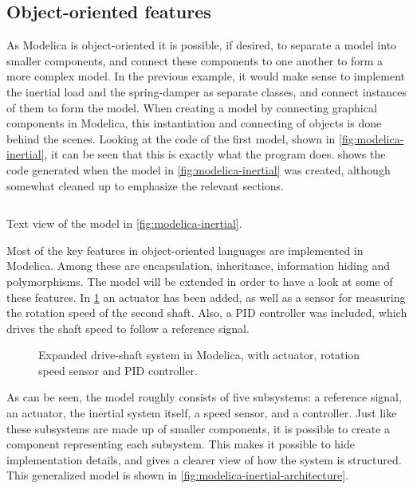 \documentclass[\rootfolder/main.tex]{subfiles}
\begin{document}
\subsection{Object-oriented features}

As Modelica is object-oriented it is possible, if desired, to separate a model into smaller components, and connect these components to one another to form a more complex model.
In the previous example, it would make sense to implement the inertial load and the spring-damper as separate classes, and connect instances of them to form the model.
When creating a model by connecting graphical components in Modelica, this instantiation and connecting of objects is done behind the scenes.
Looking at the code of the first model, shown in \cref{fig:modelica-inertial}, it can be seen that this is exactly what the program does.
 shows the code generated when the model in \cref{fig:modelica-inertial} was created, although somewhat cleaned up to emphasize the relevant sections.

\begin{listing}[ht]
    \inputminted{Modelica}{\rootfolder/Models/MasterProject/Models/InertialBasic.mo}
    \caption{Text view of the model in \cref{fig:modelica-inertial}.\label{lst:modelica-inertial-basic}}
\end{listing}

Most of the key features in object-oriented languages are implemented in Modelica.
Among these are encapsulation, inheritance, information hiding and polymorphisms.
The model will be extended in order to have a look at some of these features.
In \cref{fig:modelica-inertial-expanded} an actuator has been added, as well as a sensor for measuring the rotation speed of the second shaft.
Also, a PID controller was included, which drives the shaft speed to follow a reference signal.

\begin{figure}[ht]
    \caption{Expanded drive-shaft system in Modelica, with actuator, rotation speed sensor and PID controller.\label{fig:modelica-inertial-expanded}}
\end{figure}

As can be seen, the model roughly consists of five subsystems: a reference signal, an actuator, the inertial system itself, a speed sensor, and a controller.
Just like these subsystems are made up of smaller components, it is possible to create a component representing each subsystem.
This makes it possible to hide implementation details, and gives a clearer view of how the system is structured.
This generalized model is shown in \cref{fig:modelica-inertial-architecture}.
\end{document}
